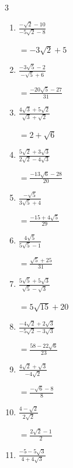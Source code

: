\begin{multicols}{3}
\begin{enumerate}
        $\displaystyle =\frac{-2\sqrt{15}-88}{113}$

  \item $\displaystyle \frac{-\sqrt{2}-10}{-5\sqrt{2}-8}$

        $\displaystyle =-3\sqrt{2}+5$

  \item $\displaystyle \frac{-3\sqrt{5}-2}{-\sqrt{5}+6}$

        $\displaystyle =\frac{-20\sqrt{5}-27}{31}$

  \item $\displaystyle \frac{4\sqrt{3}+5\sqrt{2}}{\sqrt{3}+\sqrt{2}}$

        $\displaystyle =2+\sqrt{6}$

\columnbreak %

  \item $\displaystyle \frac{5\sqrt{2}+3\sqrt{3}}{2\sqrt{2}-4\sqrt{3}}$

        $\displaystyle =\frac{-13\sqrt{6}-28}{20}$

  \item $\displaystyle \frac{-\sqrt{5}}{3\sqrt{5}+4}$

        $\displaystyle =\frac{-15+4\sqrt{5}}{29}$

  \item $\displaystyle \frac{4\sqrt{5}}{5\sqrt{5}-1}$

        $\displaystyle =\frac{\sqrt{5}+25}{31}$

  \item $\displaystyle \frac{5\sqrt{5}+5\sqrt{3}}{\sqrt{5}-\sqrt{3}}$

        $\displaystyle =5\sqrt{15}+20$

  \item $\displaystyle \frac{-4\sqrt{2}+2\sqrt{3}}{-5\sqrt{2}-3\sqrt{3}}$

        $\displaystyle =\frac{58-22\sqrt{6}}{23}$

\columnbreak %

  \item $\displaystyle \frac{4\sqrt{2}+\sqrt{3}}{-4\sqrt{2}}$

        $\displaystyle =\frac{-\sqrt{6}-8}{8}$

  \item $\displaystyle \frac{4-\sqrt{2}}{2\sqrt{2}}$

        $\displaystyle =\frac{2\sqrt{2}-1}{2}$

  \item $\displaystyle \frac{-5-5\sqrt{3}}{4+4\sqrt{3}}$


\end{enumerate}
\end{multicols}
